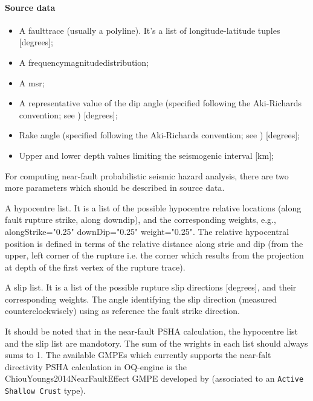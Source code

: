 \paragraph{Source data}
%
\begin{itemize}
\item A \gls{faulttrace} (usually a polyline). It's a list of 
	longitude-latitude tuples [degrees]; 
\item A \gls{frequencymagnitudedistribution};
\item A \gls{msr};
\item A representative value of the dip angle (spec\-i\-fied following 
the Aki-Richards convention; see \citet{aki2002}) [degrees];
\item Rake angle (spec\-i\-fied following the Aki-Rich\-ards convention; 
see \citet{aki2002}) [degrees]; 
\item Upper and lower depth values limiting the seismogenic interval [km]; 
\end{itemize}
For computing near-fault probabilistic seismic hazard analysis, there are two
more parameters which should be described in source data.
\item A hypocentre list. It is a list of the possible hypocentre relative locations
(along fault rupture strike, along downdip), and the corresponding weights, e.g.,
alongStrike="0.25" downDip="0.25" weight="0.25". The relative hypocentral position is
defined in terms of the relative distance along strie and dip (from the upper, left
corner of the rupture i.e. the corner which results from the projection at depth of
the first vertex of the rupture trace).
\item A slip list. It is a list of the possible rupture slip directions [degrees],
and their corresponding weights. The angle identifying the slip direction (measured
counterclockwisely) using as reference the fault strike direction.

It should be noted that in the near-fault PSHA calculation, the hypocentre list and
the slip list are mandotory. The sum of the wrights in each list should always sums
to 1. The available GMPEs which currently supports the near-falt directivity PSHA
calculation in OQ-engine is the ChiouYoungs2014NearFaultEffect GMPE developed
by \citet{chiou2014update}(associated to an \texttt{Active Shallow Crust}
type).

